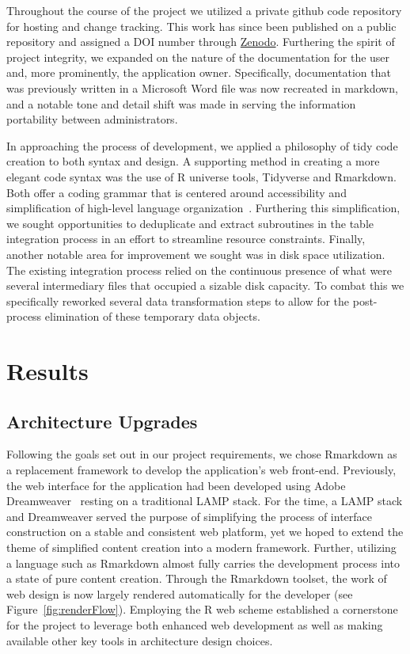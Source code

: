 \documentclass[10pt]{report}
\begin{document}
Throughout the course of the project we utilized a private github code repository for hosting and change tracking. This work has since been published on a public repository and assigned a DOI number through \href{https://zenodo.org/record/4422027}{Zenodo}. Furthering the spirit of project integrity, we expanded on the nature of the documentation for the user and, more prominently, the application owner. Specifically, documentation that was previously written in a Microsoft Word file was now recreated in markdown, and a notable tone and detail shift was made in serving the information portability between administrators.

In approaching the process of development, we applied a philosophy of tidy code creation to both syntax and design. A supporting method in creating a more elegant code syntax was the use of R universe tools, Tidyverse and Rmarkdown. Both offer a coding grammar that is centered around accessibility and simplification of high-level language organization~\cite{wickhamWelcomeTidyverse2019}. Furthering this simplification, we sought opportunities to deduplicate and extract subroutines in the table integration process in an effort to streamline resource constraints. Finally, another notable area for improvement we sought was in disk space utilization. The existing integration process relied on the continuous presence of what were several intermediary files that occupied a sizable disk capacity. To combat this we specifically reworked several data transformation steps to allow for the post-process elimination of these temporary data objects.

\section{Results}

\subsection{Architecture Upgrades}
Following the goals set out in our project requirements, we chose Rmarkdown as a replacement framework to develop the application's web front-end. Previously, the web interface for the application had been developed using Adobe Dreamweaver~\cite{abbottCandidateCancerGene2015a} resting on a traditional LAMP stack. For the time, a LAMP stack and Dreamweaver served the purpose of simplifying the process of interface construction on a stable and consistent web platform, yet we hoped to extend the theme of simplified content creation into a modern framework. Further, utilizing a language such as Rmarkdown almost fully carries the development process into a state of pure content creation. Through the Rmarkdown toolset, the work of web design is now largely rendered automatically for the developer (see Figure~\ref{fig:renderFlow}). Employing the R web scheme established a cornerstone for the project to leverage both enhanced web development as well as making available other key tools in architecture design choices.
\end{document}
